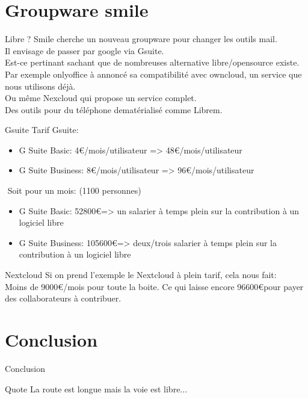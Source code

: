 \documentclass{beamer}
\begin{document}
\section{Groupware smile}
\begin{frame}{Libre ?}
Smile cherche un nouveau groupware pour changer les outils mail.\\
Il envisage de passer par google via Gsuite.\\
Est-ce pertinant sachant que de nombreuses alternative libre/opensource existe.\newline
\newline
Par exemple onlyoffice à annoncé sa compatibilité avec owncloud, un service que nous utilisons déjà.\\
Ou même Nexcloud qui propose un service complet.\\
Des outils pour du téléphone dematérialisé comme Librem.
\end{frame}

\begin{frame}{Gsuite}
	Tarif Gsuite:
	\begin{itemize}
		\item G Suite Basic: 4\euro/mois/utilisateur => 48\euro/mois/utilisateur
		\item G Suite Business: 8\euro/mois/utilisateur => 96\euro/mois/utilisateur
	\end{itemize}

	$ $\newline
	Soit pour un mois: \tiny(1100 personnes)\normalsize \\
	\begin{itemize}
		\item G Suite Basic: 52800\euro\space => un salarier à temps plein sur la contribution à un logiciel libre
		\item G Suite Business: 105600\euro\space => deux/trois salarier à temps plein sur la contribution à un logiciel libre
	\end{itemize}
\end{frame}

\begin{frame}{Nextcloud}
	Si on prend l'exemple le Nextcloud à plein tarif, cela nous fait: \\
	Moins de 9000\euro/mois pour toute la boite. \newline
	\newline
	Ce qui laisse encore 96600\euro pour payer des collaborateurs à contribuer.
\end{frame}


\section{Conclusion}
\begin{frame}{Conclusion}
	\begin{block}{Quote}
		La route est longue mais la voie est libre...
	\end{block}
\end{frame}
\end{document}
